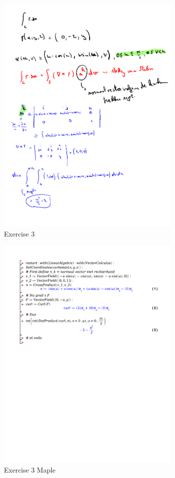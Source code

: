 \documentclass[a4paper]{report}
\begin{document}
\begin{figure}[H]
	\centering
	\includegraphics[width=0.8\textwidth]{assets/wc_7_ex_3.png}
	\caption{Exercise 3}
	\label{fig:wc_7_ex_3}
\end{figure}

\begin{figure}[H]
	\centering
	\includegraphics[width=0.8\textwidth]{exercises/wc_7_ex_3.pdf}
	\caption{Exercise 3 Maple}
	\label{fig:wc_7_ex_3_maple}
\end{figure}
\end{document}
